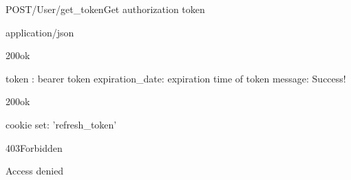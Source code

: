 \documentclass[12pt, etter]{article}
\begin{document}
\begin{apiRoute}{POST}{/User/get\_token}{Get authorization token}
    \begin{routeParameter}
    \end{routeParameter}
    \begin{routeResponse}{application/json}
        \begin{routeResponseItem}{200}{ok}
            \begin{routeResponseItemBody}
                token : bearer token
                expiration_date: expiration time of token
                message: Success!
            \end{routeResponseItemBody}
        \end{routeResponseItem}
        \begin{routeResponseItem}{200}{ok}
            \begin{routeResponseItemBody}
                cookie set: 'refresh_token'
            \end{routeResponseItemBody}   
        \end{routeResponseItem}
        \begin{routeResponseItem}{403}{Forbidden}
            \begin{routeResponseItemBody}
                Access denied
            \end{routeResponseItemBody}
        \end{routeResponseItem}
    \end{routeResponse}
\end{apiRoute}
\end{document}
